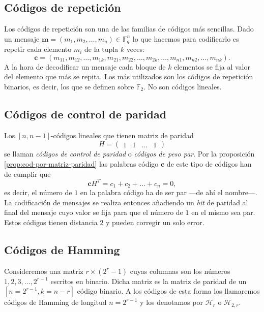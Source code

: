 \subsection{Códigos de repetición}

Los códigos de repetición son una de las familias de códigos más sencillas.
Dado un mensaje \(\mathbf{m} = (m_1, m_2, \dots, m_n) \in \mathbb F_q^n\) lo que hacemos para codificarlo es repetir cada elemento \(m_i\) de la tupla \(k\) veces: 
\[
  \mathbf{c} = (m_{11}, m_{12}, \dots, m_{1k}, m_{21}, m_{22}, \dots, m_{2k}, \dots, m_{n1}, m_{n2}, \dots, m_{nk}).
\]
A la hora de decodificar un mensaje cada bloque de \(k\) elementos se fija al valor del elemento que más se repita. 
Los más utilizados son los códigos de repetición binarios, es decir, los que se definen sobre \(\mathbb F_2\).
No son códigos lineales.

\subsection{Códigos de control de paridad}

Los \([n, n -1]\)-códigos lineales que tienen matriz de paridad \[
  H = \begin{pmatrix}
    1 & 1 & \dots & 1
  \end{pmatrix}
\] se llaman \textit{códigos de control de paridad} o \textit{códigos de peso par}.
Por la proposición \ref{prop:cod-por-matriz-paridad} las palabras código \(\mathbf{c}\) de este tipo de códigos han de cumplir que
\[
  \mathbf{c}H^T = c_1 + c_2 + \dots + c_n = 0,
\]
es decir, el número de \(1\) en la palabra código ha de ser par —de ahí el nombre—.
La codificación de mensajes se realiza entonces añadiendo un \textit{bit} de paridad al final del mensaje cuyo valor se fija para que el número de \(1\) en el mismo sea par.
Estos códigos tienen distancia \(2\) y pueden corregir un solo error.

\subsection{Códigos de Hamming}

Consideremos una matriz \(r \times (2^r - 1)\) cuyas columnas son los números \(1, 2, 3, \dots, 2^{r-1}\) escritos en binario. 
Dicha matriz es la matriz de paridad de un \([n=2^{r-1}, k=n-r]\) código binario.
A los códigos de esta forma los llamaremos códigos de Hamming de longitud \(n = 2^{r-1}\) y los denotamos por \(\mathcal H_r\) o \(\mathcal H_{2,r}\).

